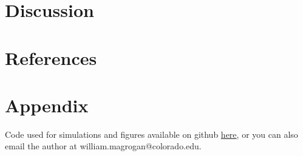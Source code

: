 \documentclass[11pt, twocolumn]{article}
\begin{document}
\section*{Discussion}
\section*{References}
\section*{Appendix}
Code used for simulations and figures available on github  \href{https://github.com/WilliamMagrogan/InfectiousDiseaseModeling}{here}, or you can also email the author at william.magrogan@colorado.edu.
\end{document}
